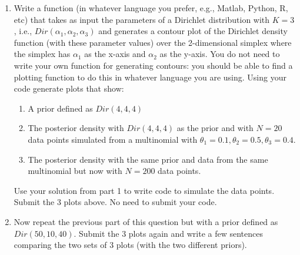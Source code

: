 \documentclass[11pt]{article}
\begin{document}
\begin{enumerate}
\item Write a function (in whatever language you prefer, e.g., Matlab, Python, R, etc)  that takes as input the parameters of a Dirichlet distribution with $K=3$, i.e., $Dir(\alpha_1, \alpha_2, \alpha_3)$ and generates a contour plot of the Dirichlet density function (with these parameter values) over the 2-dimensional simplex where the  simplex has $\alpha_1$ as the x-axis and $\alpha_2$ as the y-axis. You do not need to write your own function for generating contours: you should be able to find a plotting function to do this in whatever language you are using.
Using your code generate plots that show:
\begin{enumerate}
\item  A prior defined as $Dir(4,4, 4)$ 
\item  The posterior density with $Dir(4,4, 4)$ as the prior and with $N=20$ data points simulated from a multinomial with $\theta_1 = 0.1, \theta_2 = 0.5, \theta_3 = 0.4$. 
\item The posterior density with the same prior and data from the same multinomial but now with $N=200$ data points.
\end{enumerate}
Use your solution from part 1 to write code to simulate the data points.   Submit the 3 plots above. No need to submit your code.

\item Now repeat the previous part of this question but with a prior defined as $Dir(50,10,40)$. Submit the 3 plots again and write a few sentences comparing the two sets of 3 plots  (with the two different priors).

 \end{enumerate}

 
\end{document}
